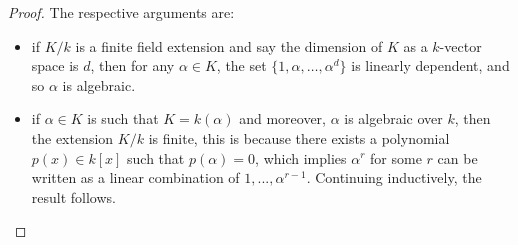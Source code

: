 \documentclass[12pt]{article}
\theoremstyle{plain}
\theoremstyle{definition}
\begin{document}
	\begin{proof} The respective arguments are:
		\begin{itemize}
			\item if $K/k$ is a finite field extension and say the dimension of $K$ as a $k$-vector space is $d$, then for any $\alpha \in K$, the set $\lbrace 1, \alpha, \hdots, \alpha^d\rbrace$ is linearly dependent, and so $\alpha$ is algebraic.
			\item if $\alpha \in K$ is such that $K = k(\alpha)$ and moreover, $\alpha$ is algebraic over $k$, then the extension $K/k$ is finite, this is because there exists a polynomial $p(x) \in k[x]$ such that $p(\alpha) = 0$, which implies $\alpha^r$ for some $r$ can be written as a linear combination of $1,...,\alpha^{r-1}$. Continuing inductively, the result follows.
		\end{itemize}
	\end{proof}
\end{document}
